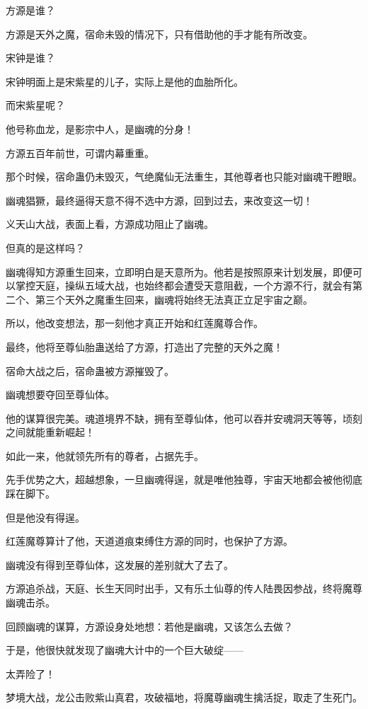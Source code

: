 \begin{this_body}
方源是谁？

方源是天外之魔，宿命未毁的情况下，只有借助他的手才能有所改变。

宋钟是谁？

宋钟明面上是宋紫星的儿子，实际上是他的血胎所化。

而宋紫星呢？

他号称血龙，是影宗中人，是幽魂的分身！

方源五百年前世，可谓内幕重重。

那个时候，宿命蛊仍未毁灭，气绝魔仙无法重生，其他尊者也只能对幽魂干瞪眼。

幽魂猖獗，最终逼得天意不得不选中方源，回到过去，来改变这一切！

义天山大战，表面上看，方源成功阻止了幽魂。

但真的是这样吗？

幽魂得知方源重生回来，立即明白是天意所为。他若是按照原来计划发展，即便可以掌控天庭，操纵五域大战，也始终都会遭受天意阻截，一个方源不行，就会有第二个、第三个天外之魔重生回来，幽魂将始终无法真正立足宇宙之巅。

所以，他改变想法，那一刻他才真正开始和红莲魔尊合作。

最终，他将至尊仙胎蛊送给了方源，打造出了完整的天外之魔！

宿命大战之后，宿命蛊被方源摧毁了。

幽魂想要夺回至尊仙体。

他的谋算很完美。魂道境界不缺，拥有至尊仙体，他可以吞并安魂洞天等等，顷刻之间就能重新崛起！

如此一来，他就领先所有的尊者，占据先手。

先手优势之大，超越想象，一旦幽魂得逞，就是唯他独尊，宇宙天地都会被他彻底踩在脚下。

但是他没有得逞。

红莲魔尊算计了他，天道道痕束缚住方源的同时，也保护了方源。

幽魂没有得到至尊仙体，这发展的差别就大了去了。

方源追杀战，天庭、长生天同时出手，又有乐土仙尊的传人陆畏因参战，终将魔尊幽魂击杀。

回顾幽魂的谋算，方源设身处地想：若他是幽魂，又该怎么去做？

于是，他很快就发现了幽魂大计中的一个巨大破绽——

太弄险了！

梦境大战，龙公击败紫山真君，攻破福地，将魔尊幽魂生擒活捉，取走了生死门。


\end{this_body}
